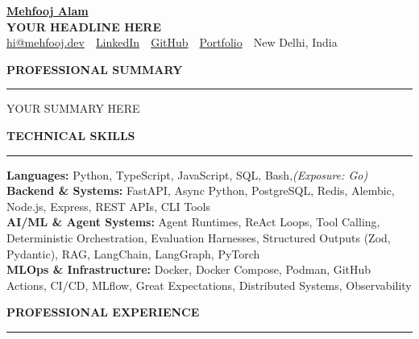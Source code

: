 \documentclass[10pt,letterpaper]{article}
\makeatletter
\newcommand{\fullname}{Mehfooj Alam}
\newcommand{\contactemail}{hi@mehfooj.dev}
\newcommand{\linkedinurl}{https://www.linkedin.com/in/mehfooj-a-b6aa0b243/}
\newcommand{\githuburl}{https://github.com/tsvlgd}
\newcommand{\portfoliourl}{https://mehfooj.dev}
\newcommand{\citytext}{New Delhi, India}
\newif\ifFly    %
\newif\ifPort   %
\newcommand{\rolehead}{}
\newcommand{\summarytext}{}
\newcommand{\rowlang}{Python, TypeScript, JavaScript, SQL, Bash,\textit{(Exposure: Go)}}
\newcommand{\rowlabel}{Backend \& Data}
\newcommand{\rowfs}{FastAPI, Django, Node.js, Express, Celery, Redis, PostgreSQL, REST APIs}
\newcommand{\rowai}{LLMs, RAG, Agentic Workflows, LangChain, LangGraph, PyTorch, LLM Fine-tuning, ML Pipelines}
\newcommand{\rowops}{Docker, Podman, GitHub Actions, MLflow, CI/CD, GitHub API, Distributed Systems, Observability}
\renewcommand{\rolehead}{Software Developer \textbar\ Full Stack AI Engineer \textbullet\ Backend \textbullet\ Agentic AI Systems}%
\renewcommand{\summarytext}{Software Developer building \textbf{full stack AI products} (Next.js, TypeScript) and \textbf{Python backends}: async APIs, PostgreSQL, Redis, Docker. Experience across backend microservices, OSINT data pipelines, CI/CD, and LLM features with structured outputs and provider fallbacks.}%
\renewcommand{\rowlabel}{Full Stack \& Backend}%
\renewcommand{\rowfs}{Next.js, React, FastAPI, Node.js, Express, Django, PostgreSQL, MongoDB, Redis, REST APIs}%
\renewcommand{\rowai}{LLMs, Agentic Workflows, Tool Calling, RAG, Structured Outputs, LangChain, LangGraph, PyTorch}%
\renewcommand{\rolehead}{Backend Engineer \textbar\ Python \textbullet\ Distributed Systems \textbullet\ Agentic AI Systems}%
\renewcommand{\summarytext}{Backend Engineer specialized in \textbf{async Python services}, \textbf{data pipelines}, and \textbf{LLM based systems}. Experience building microservices, OSINT ingestion, CI/CD automation, and agent runtimes.}%
\renewcommand{\rowfs}{FastAPI, Django, Node.js, Express, Redis, PostgreSQL, Alembic, REST APIs}%
\renewcommand{\rolehead}{AI Systems \& Backend Engineer \textbar\ Agent Runtimes \textbullet\ Async Python \textbullet\ Developer Tools}%
\renewcommand{\summarytext}{Software Engineer building \textbf{agent runtimes and developer tools from first principles}: ReAct execution loops, tool calling, deterministic orchestration, and \textbf{async Python backends} (FastAPI, PostgreSQL, Redis, Docker). Experience with CI/CD infrastructure, log analysis pipelines, and evaluation environments for LLM agents.}%
\renewcommand{\rowlabel}{Backend \& Systems}%
\renewcommand{\rowfs}{FastAPI, Async Python, PostgreSQL, Redis, Alembic, Node.js, Express, REST APIs, CLI Tools}%
\renewcommand{\rowai}{Agent Runtimes, ReAct Loops, Tool Calling, Deterministic Orchestration, Evaluation Harnesses, Structured Outputs (Zod, Pydantic), RAG, LangChain, LangGraph, PyTorch}%
\renewcommand{\rowops}{Docker, Docker Compose, Podman, GitHub Actions, CI/CD, MLflow, Great Expectations, Distributed Systems, Observability}%
\renewcommand{\rolehead}{YOUR HEADLINE HERE}%
\renewcommand{\summarytext}{YOUR SUMMARY HERE}%
\newcommand{\ressection}[1]{%
  \vspace{1.5pt}%
  \begin{center}{\bfseries\color{myblue}\large #1}\end{center}%
  \vspace{-8pt}%
  {\color{myblue}\rule{\linewidth}{0.8pt}}%
  \vspace{0.5pt}%
}
\newenvironment{rlist}{%
  \begin{itemize}[leftmargin=1.3em, itemsep=0pt, topsep=0pt, parsep=0pt, label=\textbullet]%
}{\end{itemize}}
\newcommand{\entryheader}[2]{%
  \noindent\begin{tabularx}{\linewidth}{@{}X r@{}}\textbf{#1} & \textbf{#2}\end{tabularx}\vspace{-1pt}%
}
\newcommand{\entrysub}[2]{%
  \noindent\begin{tabularx}{\linewidth}{@{}X r@{}}#1 & #2\end{tabularx}\vspace{-1pt}%
}
\newcommand{\techstack}[1]{\vspace{0pt}\noindent{\footnotesize\itshape\color{black!65}Technologies Used: #1}\vspace{1pt}}
\makeatother
\begin{document}
\fontsize{9.4}{11.1}\selectfont

\begin{center}
    {\LARGE\bfseries \href{\portfoliourl}{\color{myblue}\fullname} \\[2pt]}
    {\large\bfseries \rolehead}\\[3pt]
    \href{mailto:\contactemail}{\color{myblue}\contactemail}\ \textbar\ \href{\linkedinurl}{\color{myblue}LinkedIn}\ \textbar\ \href{\githuburl}{\color{myblue}GitHub}\ \textbar\ \href{\portfoliourl}{\color{myblue}Portfolio}\ \textbar\ \citytext
\end{center}
\vspace{1pt}

\ressection{PROFESSIONAL SUMMARY}

\noindent \summarytext

\vspace{2pt}
\ressection{TECHNICAL SKILLS}

\noindent
\textbf{Languages:} \rowlang \\
\textbf{\rowlabel:} \rowfs \\
\textbf{AI/ML \& Agent Systems:} \rowai \\
\textbf{MLOps \& Infrastructure:} \rowops
\ifPort\\
\textbf{Portfolio:} \href{\portfoliourl}{\color{myblue}mehfooj.dev}, a Next.js and React site (work, projects, resume, blog) built and deployed independently.
\fi
\vspace{3pt}

\ressection{PROFESSIONAL EXPERIENCE}

\ifFly
\entryheader{Backend Engineering Trainee}{Jul 2026 -- Present}
\entrysub{\textcolor{myblue}{FlyRank AI}}{Remote}

\begin{rlist}
  \item Ship async REST APIs (\href{https://github.com/tsvlgd/flyrank-backend}{\color{myblue}repo}) in near daily commits with \textbf{FastAPI, PostgreSQL, and Redis}: connection pooling, Alembic migrations, request validation, search and filter endpoints, and a health check covering both datastores.
  \item Containerized the stack with \textbf{Docker Compose} (migrations run on startup) and wrote an integration test suite (13 passing tests on an isolated test database); fixed a duplicate insert race condition with database level constraints.
  \item Currently adding \textbf{JWT authentication} through an identity provider, protected routes, and \textbf{Redis backed rate limiting} middleware.
\end{rlist}
\techstack{Python, FastAPI, PostgreSQL, Redis, Docker Compose}
\fi
\end{document}
